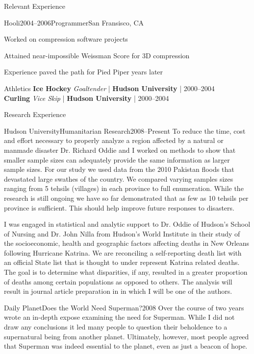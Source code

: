 \documentclass{resume}
\begin{document}
\begin{rSection}{Relevant Experience}
\begin{rSubsection}{Hooli}{2004--2006}{Programmer}{San Fransisco, CA}
\item Worked on compression software projects
\item Attained near-impossible Weissman Score for 3D compression
\item Experience paved the path for Pied Piper years later
\end{rSubsection}

\end{rSection}

\begin{rSection}{Athletics}
\textbf{Ice Hockey} \emph{Goaltender} | \textbf{Hudson University} | 2000--2004 \\
\textbf{Curling} \emph{Vice Skip} | \textbf{Hudson University} | 2000--2004
\end{rSection}

\clearpage

\begin{rSection}{Research Experience}

\begin{research}{Hudson University}{Humanitarian Research}{2008--Present}
To reduce the time, cost and effort necessary to properly analyze a region affected by a natural or manmade disaster Dr. Richard Oddie and I worked on methods to show that smaller sample sizes can adequately provide the same information as larger sample sizes.  For our study we used data from the 2010 Pakistan floods that devastated large swathes of the country.  We compared varying samples sizes ranging from 5 tehsils (villages) in each province to full enumeration.  While the research is still ongoing we have so far demonstrated that as few as 10 tehsils per province is sufficient.  This should help improve future responses to disasters.


I was engaged in statistical and analytic support to Dr. Oddie of Hudson's School of Nursing and Dr. John Nilla from Hudson's World Institute in their study of the socioeconomic, health and geographic factors affecting deaths in New Orleans following Hurricane Katrina. We are reconciling a self-reporting death list with an official State list that is thought to under represent Katrina related deaths. The goal is to determine what disparities, if any, resulted in a greater proportion of deaths among certain populations as opposed to others. The analysis will result in journal article preparation in in which I will be one of the authors.


\end{research}

\begin{research}{Daily Planet}{Does the World Need Superman?}{2008}
Over the course of two years wrote an in-depth expose examining the need for Superman.  While I did not draw any conclusions it led many people to question their beholdence to a supernatural being from another planet.  Ultimately, however, most people agreed that Superman was indeed essential to the planet, even as just a beacon of hope.


\end{research}

\end{rSection}
\end{document}
